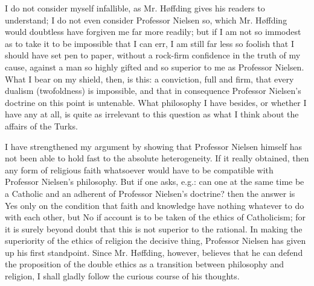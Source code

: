 \documentclass[12pt,a4paper,openany]{book}
\newcommand{\opage}[1]{\marginnote{\footnotesize\textit{[#1]}}}
\begin{document}
I do not consider myself infallible, as Mr. Høffding gives his
readers to understand; I do not even consider Professor
Nielsen so, which Mr. Høffding would doubtless have forgiven me
far more readily; but if I am not so immodest as to
take it to be impossible that I can err, I am still far
less so foolish that I should have set pen to paper, without a rock-firm
confidence in the truth of my cause, against a man so highly gifted
and so superior to me as Professor Nielsen.
What I bear on my shield, then, is this: a conviction,
full and firm, that every dualism (twofoldness) is impossible,
and that in consequence Professor Nielsen's doctrine on this
point is untenable. What philosophy I have besides, or whether
I have any at all, is quite as irrelevant to this question
as what I think about the affairs of the
Turks.

I have strengthened my argument by showing that Professor
Nielsen himself has not been able to hold fast to the absolute
heterogeneity. If it really obtained, then any
\opage{19}form of religious faith whatsoever would have to be compatible with
Professor Nielsen's philosophy. But if one asks, e.g.: can one at the same time
be a Catholic and an adherent of Professor Nielsen's doctrine? then
the answer is Yes only on the condition that faith and knowledge have
nothing whatever to do with each other, but No if account is to be taken of
the ethics of Catholicism; for it is surely beyond doubt that this
is not superior to the rational. In making the superiority of the ethics
of religion the decisive thing, Professor Nielsen has given up his
first standpoint. Since Mr. Høffding, however, believes that he
can defend the proposition of the double ethics as a transition
between philosophy and religion, I shall gladly follow the curious
course of his thoughts.
\end{document}
